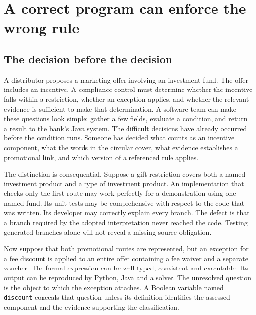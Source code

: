 \chapter{A correct program can enforce the wrong rule}
\label{ch:problem}

\section{The decision before the decision}
\label{merge:M01:00}

\label{sec:problem-decision}
A distributor proposes a marketing offer involving an investment fund. The
offer includes an incentive. A compliance control must determine whether the
incentive falls within a restriction, whether an exception applies, and whether
the relevant evidence is sufficient to make that determination. A software team
can make these questions look simple: gather a few fields, evaluate a condition,
and return a result to the bank's Java system. The difficult decisions have
already occurred before the condition runs. Someone has decided what counts as
an incentive component, what the words in the circular cover, what evidence
establishes a promotional link, and which version of a referenced rule applies.

The distinction is consequential. Suppose a gift restriction covers both a
named investment product and a type of investment product. An implementation
that checks only the first route may work perfectly for a demonstration using
one named fund. Its unit tests may be comprehensive with respect to the code
that was written. Its developer may correctly explain every branch. The defect
is that a branch required by the adopted interpretation never reached the code.
Testing generated branches alone will not reveal a missing source obligation.


Now suppose that both promotional routes are represented, but an exception for
a fee discount is applied to an entire offer containing a fee waiver and a
separate voucher. The formal expression can be well typed, consistent and
executable. Its output can be reproduced by Python, Java and a solver. The
unresolved question is the object to which the exception attaches. A Boolean
variable named \texttt{discount} conceals that question unless its definition
identifies the assessed component and the evidence supporting the classification.

